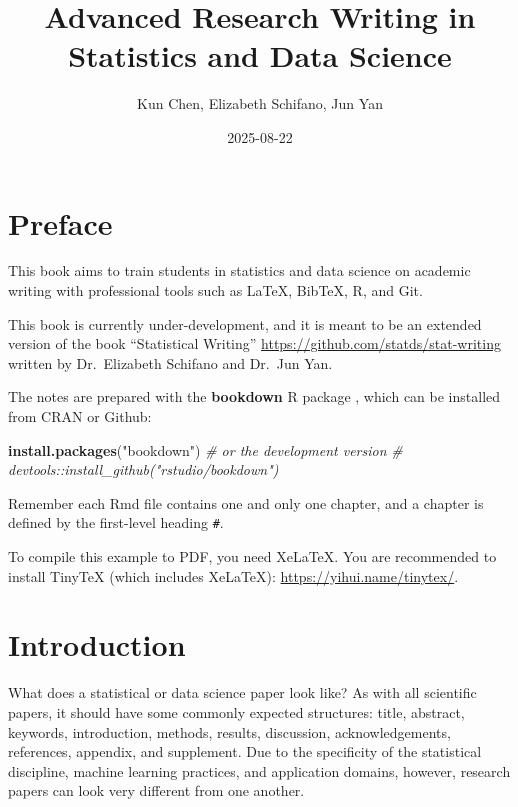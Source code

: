 \documentclass[
]{book}
\title{Advanced Research Writing in Statistics and Data Science}
\author{Kun Chen, Elizabeth Schifano, Jun Yan}
\date{2025-08-22}
\newenvironment{Shaded}{\begin{snugshade}}{\end{snugshade}}
\newcommand{\CommentTok}[1]{\textcolor[rgb]{0.56,0.35,0.01}{\textit{#1}}}
\newcommand{\FunctionTok}[1]{\textcolor[rgb]{0.13,0.29,0.53}{\textbf{#1}}}
\newcommand{\NormalTok}[1]{#1}
\newcommand{\StringTok}[1]{\textcolor[rgb]{0.31,0.60,0.02}{#1}}
\theoremstyle{definition}
\theoremstyle{definition}
\theoremstyle{definition}
\theoremstyle{definition}
\theoremstyle{remark}
\begin{document}
\maketitle

{
\setcounter{tocdepth}{1}
\tableofcontents
}
\chapter*{Preface}\label{preface}

This book aims to train students in statistics and data science on academic
writing with professional tools such as LaTeX, BibTeX, R, and Git.

This book is currently under-development, and it is meant to be
an extended version of the book ``Statistical Writing'' \url{https://github.com/statds/stat-writing} written by Dr.~Elizabeth Schifano and Dr.~Jun Yan.

The notes are prepared with the \textbf{bookdown} R package \citep{xie2016bookdown},
which can be installed from CRAN or Github:

\begin{Shaded}
\begin{Highlighting}[]
\FunctionTok{install.packages}\NormalTok{(}\StringTok{"bookdown"}\NormalTok{)}
\CommentTok{\# or the development version}
\CommentTok{\# devtools::install\_github("rstudio/bookdown")}
\end{Highlighting}
\end{Shaded}

Remember each Rmd file contains one and only one chapter, and a chapter is
defined by the first-level heading \texttt{\#}.

To compile this example to PDF, you need XeLaTeX. You are recommended to install
TinyTeX (which includes XeLaTeX): \url{https://yihui.name/tinytex/}.

\chapter{Introduction}\label{intro}

What does a statistical or data science paper look like? As with all scientific papers, it should have some commonly expected structures: title, abstract, keywords, introduction, methods, results, discussion, acknowledgements, references, appendix, and supplement. Due to the specificity of the statistical discipline, machine learning practices, and application domains, however, research papers can look very different from one another.
\end{document}
